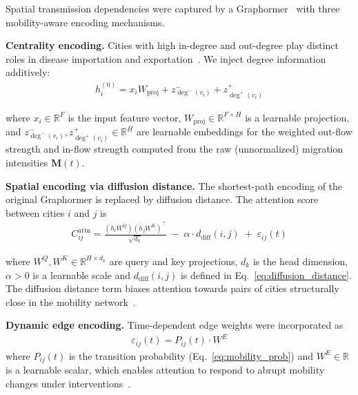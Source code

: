 \documentclass[10pt,letterpaper]{article}
\begin{document}
	Spatial transmission dependencies were captured by a Graphormer~\cite{ying2021} with
	three mobility-aware encoding mechanisms.
	
	\noindent\textbf{Centrality encoding.}
	Cities with high in-degree and out-degree play distinct roles in disease importation
	and exportation~\cite{kraemer2020}. We inject degree information additively:
	\begin{align*}
		h_i^{(0)} = x_i W_{\mathrm{proj}} + z_{\deg^{-}(v_i)}^{-} + z_{\deg^{+}(v_i)}^{+}
	\end{align*}
	
	\noindent where $x_i \in \mathbb{R}^{F}$ is the input feature vector, $W_{\mathrm{proj}}
	\in \mathbb{R}^{F \times H}$ is a learnable projection, and $z_{\deg^{-}(v_i)}^{-},
	z_{\deg^{+}(v_i)}^{+} \in \mathbb{R}^{H}$ are learnable embeddings for the weighted out-flow strength and in-flow strength computed from the raw (unnormalized) migration intensities $\mathbf{M}(t)$.
	
	\noindent\textbf{Spatial encoding via diffusion distance.}
	The shortest-path encoding of the original Graphormer is replaced by diffusion
	distance. The attention score between cities $i$ and $j$ is
	\begin{align*}
		C_{ij}^{\mathrm{attn}}
		= \frac{(h_i W^Q)(h_j W^K)^\top}{\sqrt{d_k}}
		\;-\; \alpha \cdot d_{\mathrm{diff}}(i,j)
		\;+\; \varepsilon_{ij}(t)
	\end{align*}
	
	\noindent where $W^Q, W^K \in \mathbb{R}^{H \times d_k}$ are query and key projections, $d_k$ is the head dimension, $\alpha > 0$ is a learnable scale and $d_{\mathrm{diff}}(i,j)$ is defined in Eq.~\ref{eq:diffusion_distance}. The diffusion distance term biases attention towards pairs of cities structurally close in
	the mobility network~\cite{coifman2006}.
	
	\noindent\textbf{Dynamic edge encoding.}
	Time-dependent edge weights were incorporated as
	\begin{align*}
		\varepsilon_{ij}(t) = P_{ij}(t) \cdot W^E
	\end{align*}
	\noindent where $P_{ij}(t)$ is the transition probability (Eq.~\ref{eq:mobility_prob})
	and $W^E \in \mathbb{R}$ is a learnable scalar, which enables attention to respond to abrupt mobility changes under interventions~\cite{kraemer2020}.
	
\end{document}
